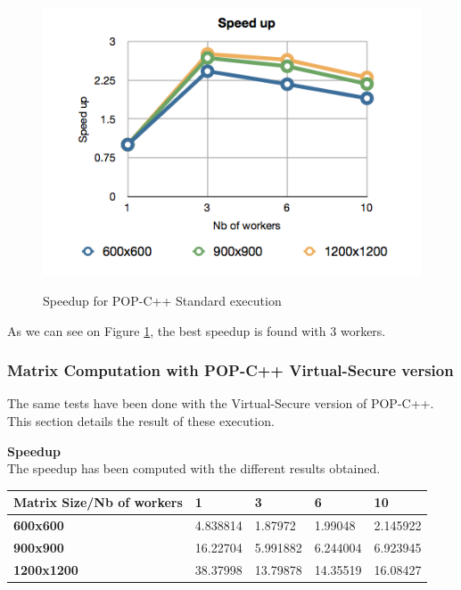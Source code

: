 \begin{figure}[ht]
	\caption{Speedup for POP-C++ Standard execution}
  	\centering
	\includegraphics[scale=0.6]{./pic/speedup_std.png}
	\label{fig:speedup1}
\end{figure}

As we can see on Figure \ref{fig:speedup1}, the best speedup is found with 3 workers. 
\pagebreak
\subsubsection{Matrix Computation with POP-C++ Virtual-Secure version}
The same tests have been done with the Virtual-Secure version of POP-C++. This section details the result of these execution.

\textbf{Speedup}\\
The speedup has been computed with the different results obtained.
\begin{center}
\begin{tabular}{|p{6cm}|p{2cm}|p{2cm}|p{2cm}|p{2cm}|}
\hline
\textbf{Matrix Size/Nb of workers} & \textbf{1}	& \textbf{3} 	& \textbf{6}	& \textbf{10}\\ \hline
\textbf{600x600} &  4.838814 & 1.87972 & 1.99048 & 2.145922 \\ \hline
\textbf{900x900} & 16.22704 &	5.991882 &	6.244004 &  6.923945\\ \hline
\textbf{1200x1200} & 38.37998 & 13.79878 & 14.35519 & 16.08427\\ \hline
\end{tabular}
\end{center}\s

